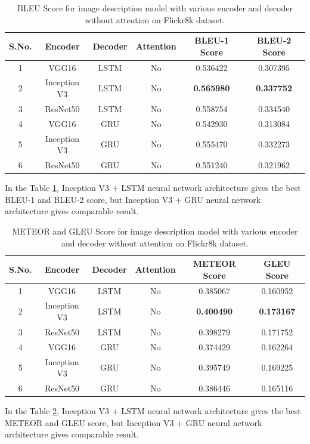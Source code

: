 \begin{table}[h!]
    \centering
    \caption{BLEU Score for image description model with various encoder and decoder without attention on Flickr8k dataset.}
    \begin{tabular}{ |c|c|c|c|c|c| } 
     \hline
     \textbf{S.No.} & \textbf{Encoder} & \textbf{Decoder} & \textbf{Attention} & \textbf{BLEU-1 Score} & \textbf{BLEU-2 Score}\\ 
     \hline
     1 & VGG16 & LSTM & No & 0.536422 & 0.307395 \\ 
     \hline
     2 & Inception V3 & LSTM & No & \textbf{0.565980}	&  \textbf{0.337752} \\
     \hline
     3 & ResNet50 & LSTM & No & 0.558754 & 0.334540 \\
     \hline
     4 & VGG16 & GRU & No & 0.542930 & 0.313084 \\
     \hline
     5 & Inception V3 & GRU & No & 0.555470 & 0.332273 \\
     \hline
     6 & ResNet50 & GRU & No & 0.551240 & 0.321962 \\
     \hline
    \end{tabular}
    \label{table:2}
\end{table}

\noindent In the Table \ref{table:2}, Inception V3 + LSTM neural network architecture gives the best BLEU-1 and BLEU-2 score, but Inception V3 + GRU neural network architecture gives comparable result. \\

\begin{table}[h!]
    \centering
    \caption{METEOR and GLEU Score for image description model with various encoder and decoder without attention on Flickr8k dataset.}
    \begin{tabular}{ |c|c|c|c|c|c| } 
     \hline
     \textbf{S.No.} & \textbf{Encoder} & \textbf{Decoder} & \textbf{Attention} & \textbf{METEOR Score} & \textbf{GLEU Score}\\ 
     \hline
     1 & VGG16 & LSTM & No & 0.385067 & 0.160952	 \\ 
     \hline
     2 & Inception V3 & LSTM & No & \textbf{0.400490} & \textbf{0.173167} \\
     \hline
     3 & ResNet50 & LSTM & No & 0.398279 & 0.171752 \\
     \hline
     4 & VGG16 & GRU & No & 0.374429 & 0.162264	 \\
     \hline
     5 & Inception V3 & GRU & No & 0.395749 & 0.169225	\\
     \hline
     6 & ResNet50 & GRU & No & 0.386446 & 0.165116 \\
     \hline
    \end{tabular}
    \label{table:3}
\end{table}
\noindent In the Table \ref{table:3},  Inception V3 + LSTM neural network architecture gives the best METEOR and GLEU score, but Inception V3 + GRU neural network architecture gives comparable result.

